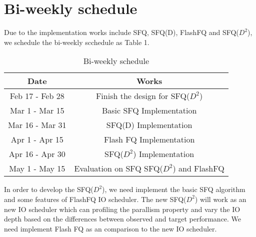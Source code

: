 \section{Bi-weekly schedule}

Due to the implementation works include SFQ, SFQ(D), FlashFQ and SFQ($D^2$), we schedule the bi-weekly scchedule as Table 1.\\
\begin{table}[t]
	\centering
	\tabcolsep=0.11cm
	\begin{tabular}{|c|c|}
		\hline
		Date & Works  \\
		\hline
		Feb 17 - Feb 28 & Finish the design for SFQ($D^2$) \\
		\hline
		Mar 1 - Mar 15 & Basic SFQ Implementation \\
		\hline
		Mar 16 - Mar 31 & SFQ(D) Implementation \\
		\hline
		Apr 1 - Apr 15  & Flash FQ Implementation \\
		\hline
		Apr 16 - Apr 30  & SFQ($D^2$) Implementation \\
		\hline
		May 1 - May 15  & Evaluation on SFQ SFQ($D^2$) and FlashFQ\\
		\hline
	\end{tabular}
	\caption{Bi-weekly schedule}
	\vspace{-12pt}
	\label{table:traces}
\end{table}

In order to develop the SFQ($D^2$), we need implement the basic SFQ algorithm and some features of FlashFQ IO scheduler. The new SFQ($D^2$) will work as an new IO scheduler which can profiling the parallism property and vary the IO depth based on the differences between observed and target performance. We need implement Flash FQ as an comparison to the new IO scheduler.